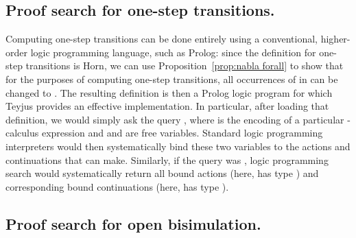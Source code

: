 \documentclass{acmtrans2m}
\begin{document}
\subsection{Proof search for one-step transitions.}
Computing one-step transitions can be done entirely using a
conventional, higher-order logic programming language, such as
Prolog: since the definition  for one-step
transitions is Horn, we can use Proposition~\ref{prop:nabla forall} to show
that for the purposes of computing one-step transitions, all
occurrences of  in  can be changed to
.  The resulting definition is then a Prolog logic
program for which Teyjus provides an effective implementation.  In particular,
after loading that definition, we would simply ask the query
, where  is the encoding of a particular
-calculus expression and  and  are free
variables.  Standard logic programming interpreters would then
systematically bind 
these two variables to the actions and continuations that  can
make.  Similarly, if the query was , logic
programming search would systematically return all bound actions
(here,  has type ) and corresponding bound
continuations (here,  has type ).

\subsection{Proof search for open bisimulation.}
\end{document}
